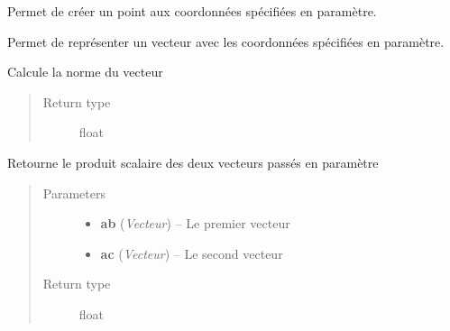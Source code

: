 \documentclass[letterpaper,10pt,english]{sphinxmanual}
\begin{document}

\begin{fulllineitems}
\label{index:Graphique.Point}
Permet de créer un point aux coordonnées spécifiées en paramètre.

\end{fulllineitems}


\begin{fulllineitems}
\label{index:Graphique.Vecteur}
Permet de représenter un vecteur avec les coordonnées spécifiées en paramètre.

\begin{fulllineitems}
\label{index:Graphique.Vecteur.norme}
Calcule la norme du vecteur
\begin{quote}\begin{description}
\item[{Return type}] \leavevmode
float

\end{description}\end{quote}

\end{fulllineitems}


\begin{fulllineitems}
\label{index:Graphique.Vecteur.produitScalaireBAC}
Retourne le produit scalaire des deux vecteurs passés en paramètre
\begin{quote}\begin{description}
\item[{Parameters}] \leavevmode\begin{itemize}
\item {} 
\textbf{ab} (\emph{Vecteur}) -- Le premier vecteur

\item {} 
\textbf{ac} (\emph{Vecteur}) -- Le second vecteur

\end{itemize}

\item[{Return type}] \leavevmode
float


\end{description}
\end{quote}
\end{fulllineitems}
\end{fulllineitems}
\end{document}
